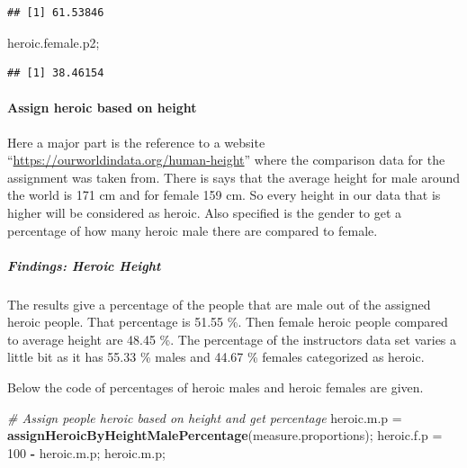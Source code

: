 \documentclass[]{article}
\newenvironment{Shaded}{\begin{snugshade}}{\end{snugshade}}
\newcommand{\CommentTok}[1]{\textcolor[rgb]{0.56,0.35,0.01}{\textit{#1}}}
\newcommand{\DecValTok}[1]{\textcolor[rgb]{0.00,0.00,0.81}{#1}}
\newcommand{\KeywordTok}[1]{\textcolor[rgb]{0.13,0.29,0.53}{\textbf{#1}}}
\newcommand{\NormalTok}[1]{#1}
\newcommand{\OperatorTok}[1]{\textcolor[rgb]{0.81,0.36,0.00}{\textbf{#1}}}
\newcommand{\StringTok}[1]{\textcolor[rgb]{0.31,0.60,0.02}{#1}}
\begin{document}
\begin{verbatim}
## [1] 61.53846
\end{verbatim}

\begin{Shaded}
\begin{Highlighting}[]
\NormalTok{heroic.female.p2;}
\end{Highlighting}
\end{Shaded}

\begin{verbatim}
## [1] 38.46154
\end{verbatim}

\newpage

\paragraph{Assign heroic based on height}
\label{sec:appendix-heroic-height}

Here a major part is the reference to a website
``\url{https://ourworldindata.org/human-height}'' where the comparison
data for the assignment was taken from. There is says that the average
height for male around the world is 171 cm and for female 159 cm. So
every height in our data that is higher will be considered as heroic.
Also specified is the gender to get a percentage of how many heroic male
there are compared to female.

\subparagraph{Findings: Heroic Height}
\label{sec:appendix-findings-heroic-height}

The results give a percentage of the people that are male out of the
assigned heroic people. That percentage is 51.55 \%. Then female heroic
people compared to average height are 48.45 \%. The percentage of the
instructors data set varies a little bit as it has 55.33 \% males and
44.67 \% females categorized as heroic.

Below the code of percentages of heroic males and heroic females are
given.

\begin{Shaded}
\begin{Highlighting}[]
\CommentTok{\# Assign people heroic based on height and get percentage}
\NormalTok{heroic.m.p =}\StringTok{ }\KeywordTok{assignHeroicByHeightMalePercentage}\NormalTok{(measure.proportions);}
\NormalTok{heroic.f.p =}\StringTok{ }\DecValTok{100} \OperatorTok{{-}}\StringTok{ }\NormalTok{heroic.m.p;}
\NormalTok{heroic.m.p;}
\end{Highlighting}
\end{Shaded}
\end{document}
